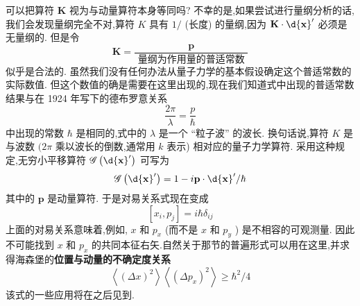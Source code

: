 \documentclass[lang=cn,newtx,10pt,scheme=chinese,thmcnt=section]{elegantbook}
\begin{document}
可以把算符 $\mathbf{K}$ 视为与动量算符本身等同吗? 不幸的是,如果尝试进行量纲分析的话,我们会发现量纲完全不对,算符 $K$ 具有 $1/$ (长度) 的量纲,因为 $\mathbf{K} \cdot \d{\mathbf{x}}^{\prime }$ 必须是无量纲的. 但是令
\begin{equation}
	\mathbf{K} = \frac{\mathbf{p}}{\text{ 量纲为作用量的普适常数 }}
\end{equation}
似乎是合法的. 虽然我们没有任何办法从量子力学的基本假设确定这个普适常数的实际数值. 但这个数值的确是需要在这里出现的,现在我们知道式中出现的普适常数结果与在 1924 年写下的德布罗意关系
\begin{equation}
	\frac{2\pi }{\lambda } = \frac{p}{\hbar }
\end{equation}
中出现的常数 $\hbar$ 是相同的,式中的 $\lambda$ 是一个 “粒子波” 的波长. 换句话说,算符 $K$ 是与波数 $({2\pi }$ 乘以波长的倒数,通常用 $k$ 表示) 相对应的量子力学算符. 采用这种规定,无穷小平移算符 $\mathscr{G}\left( {\d{\mathbf{x}}^{\prime }}\right)$ 可写为
\begin{equation}
	\mathscr{G}\left( {\d{\mathbf{x}}^{\prime }}\right) = 1 - i\mathbf{p} \cdot \d{\mathbf{x}}^{\prime }/\hbar
\end{equation}
其中的 $\mathbf{p}$ 是动量算符. 于是对易关系式现在变成
\begin{equation}
	\left\lbrack {{x}_{i},{p}_{j}}\right\rbrack = i\hbar {\delta }_{ij}
\end{equation}
上面的对易关系意味着,例如, $x$ 和 ${p}_{x}$ (而不是 $x$ 和 ${p}_{y}$ ) 是不相容的可观测量. 因此不可能找到 $x$ 和 ${p}_{x}$ 的共同本征右矢.自然关于那节的普遍形式可以用在这里,并求得海森堡的\textbf{位置与动量的不确定度关系}
\begin{equation}
	\left\langle {\left( \Delta x\right) }^{2}\right\rangle \left\langle {\left( \Delta {p}_{x}\right) }^{2}\right\rangle \geq {\hbar }^{2}/4
\end{equation}
该式的一些应用将在之后见到.
\end{document}
